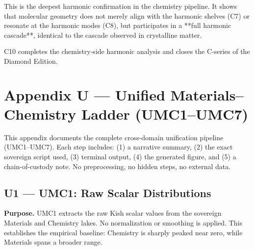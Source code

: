 \documentclass[11pt, letterpaper, openany]{book}
\begin{document}
This is the deepest harmonic confirmation in the chemistry pipeline.  
It shows that molecular geometry does not merely align with the harmonic shelves
(C7) or resonate at the harmonic modes (C8), but participates in a **full
harmonic cascade**, identical to the cascade observed in crystalline matter.

C10 completes the chemistry‑side harmonic analysis and closes the C‑series of the Diamond Edition.

\clearpage
\section*{Appendix U — Unified Materials–Chemistry Ladder (UMC1–UMC7)}

This appendix documents the complete cross-domain unification pipeline (UMC1–UMC7).
Each step includes: (1) a narrative summary, (2) the exact sovereign script used, (3) terminal output, (4) the generated figure, and (5) a chain-of-custody note.
No preprocessing, no hidden steps, no external data.

\subsection*{U1 — UMC1: Raw Scalar Distributions}

\textbf{Purpose.} UMC1 extracts the raw Kish scalar values from the sovereign Materials and Chemistry lakes.
No normalization or smoothing is applied. This establishes the empirical baseline: Chemistry is sharply peaked near zero, while Materials spans a broader range.
\end{document}
